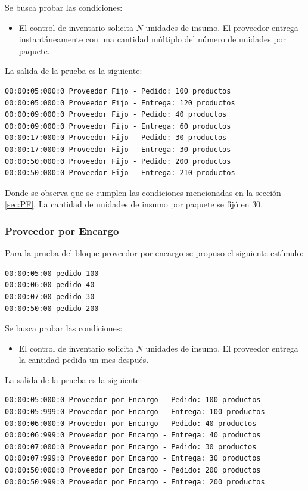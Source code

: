 \documentclass[10pt]{article}
\begin{document}
Se busca probar las condiciones:
\begin{itemize}
	\item El control de inventario solicita $N$ unidades de insumo. El proveedor entrega instantáneamente con una cantidad múltiplo del número de unidades por paquete. 
\end{itemize}

La salida de la prueba es la siguiente:

\begin{minipage}{1\textwidth}
	\centering
	\begin{lstlisting}
00:00:05:000:0 Proveedor Fijo - Pedido: 100 productos
00:00:05:000:0 Proveedor Fijo - Entrega: 120 productos
00:00:09:000:0 Proveedor Fijo - Pedido: 40 productos
00:00:09:000:0 Proveedor Fijo - Entrega: 60 productos
00:00:17:000:0 Proveedor Fijo - Pedido: 30 productos
00:00:17:000:0 Proveedor Fijo - Entrega: 30 productos
00:00:50:000:0 Proveedor Fijo - Pedido: 200 productos
00:00:50:000:0 Proveedor Fijo - Entrega: 210 productos
	\end{lstlisting}
	
\end{minipage}

Donde se observa que se cumplen las condiciones mencionadas en la sección \ref{sec:PF}. La cantidad de unidades de insumo por paquete se fijó en $30$.

\subsubsection{Proveedor por Encargo}
Para la prueba del bloque proveedor por encargo se propuso el siguiente estímulo:

\begin{minipage}{1\textwidth}
	\centering
	\begin{lstlisting}
00:00:05:00 pedido 100
00:00:06:00 pedido 40
00:00:07:00 pedido 30
00:00:50:00 pedido 200
	\end{lstlisting}
\end{minipage}

Se busca probar las condiciones:
\begin{itemize}
	\item El control de inventario solicita $N$ unidades de insumo. El proveedor entrega la cantidad pedida un mes después. 
\end{itemize}

La salida de la prueba es la siguiente:

\begin{minipage}{1\textwidth}
	\centering
	\begin{lstlisting}
00:00:05:000:0 Proveedor por Encargo - Pedido: 100 productos
00:00:05:999:0 Proveedor por Encargo - Entrega: 100 productos
00:00:06:000:0 Proveedor por Encargo - Pedido: 40 productos
00:00:06:999:0 Proveedor por Encargo - Entrega: 40 productos
00:00:07:000:0 Proveedor por Encargo - Pedido: 30 productos
00:00:07:999:0 Proveedor por Encargo - Entrega: 30 productos
00:00:50:000:0 Proveedor por Encargo - Pedido: 200 productos
00:00:50:999:0 Proveedor por Encargo - Entrega: 200 productos
	\end{lstlisting}
	
\end{minipage}
\end{document}
